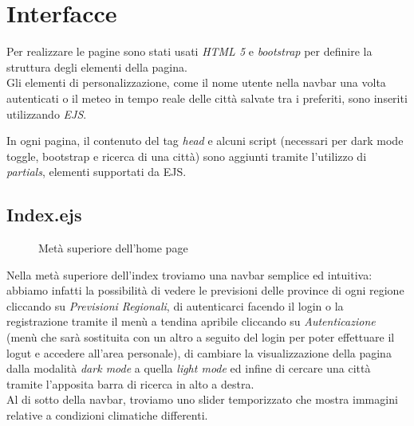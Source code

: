 \chapter{Interfacce}

Per realizzare le pagine sono stati usati \emph{HTML 5} e \emph{bootstrap} per definire la struttura 
degli elementi della pagina.\\ 
Gli elementi di personalizzazione, come il nome utente nella navbar una volta autenticati o il meteo 
in tempo reale delle città salvate tra i preferiti, sono inseriti utilizzando \emph{EJS}.

\vspace{5mm}

In ogni pagina, il contenuto del tag \emph{head} e alcuni script (necessari per dark mode toggle, bootstrap e 
ricerca di una città) sono aggiunti tramite l'utilizzo di \emph{partials}, elementi supportati da EJS.

\section{Index.ejs}

\begin{figure}[ht]
    \centering
    \caption{Metà superiore dell'home page}
\end{figure}

Nella metà superiore dell'index troviamo una navbar semplice ed intuitiva: abbiamo infatti la 
possibilità di vedere le previsioni delle province di ogni regione cliccando su 
\emph{Previsioni Regionali}, di autenticarci facendo il login o la registrazione tramite il menù a 
tendina apribile cliccando su \emph{Autenticazione} (menù che sarà sostituita con un altro  
a seguito del login per poter effettuare il logut e accedere all'area personale), di cambiare la visualizzazione 
della pagina dalla modalità \emph{dark mode} a quella \emph{light mode} ed infine di cercare una città tramite 
l'apposita barra di ricerca in alto a destra.\\
Al di sotto della navbar, troviamo uno slider temporizzato che mostra immagini relative a condizioni 
climatiche differenti. 

